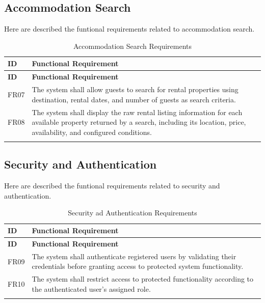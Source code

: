\subsection{Accommodation Search}

Here are described the funtional requirements related to accommodation search.


\begin{longtable}{|p{}|p{}|}
    \hline
    \textbf{ID} & 
    \textbf{Functional Requirement} \\
    \hline
    \endfirsthead

    \hline
    \textbf{ID} & \textbf{Functional Requirement} \\
    \hline
    \endhead

    FR07 &
    The system shall allow guests to search for rental properties using destination, rental dates, and number 
    of guests as search criteria. \\
    \hline

    FR08 &
    The system shall display the raw rental listing information for each available property returned by a search, 
    including its location, price, availability, and configured conditions. \\
    \hline

    \caption{Accommodation Search Requirements}
    \label{tab:as_fr}

\end{longtable}


\subsection{Security and Authentication}

Here are described the funtional requirements related to security and authentication.


\begin{longtable}{|p{}|p{}|}
    \hline
    \textbf{ID} & 
    \textbf{Functional Requirement} \\
    \hline
    \endfirsthead

    \hline
    \textbf{ID} & 
    \textbf{Functional Requirement} \\
    \hline
    \endhead

    FR09 &
    The system shall authenticate registered users by validating their credentials before granting access to 
    protected system functionality. \\
    \hline

    FR10 & 
    The system shall restrict access to protected functionality according to the authenticated user's assigned 
    role. \\
    \hline

    \caption{Security ad Authentication Requirements}
    \label{tab:sa_fr}

\end{longtable}